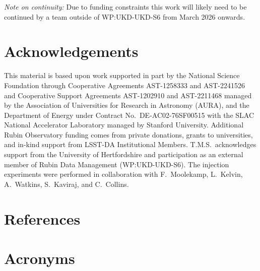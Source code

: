 \documentclass[DM,lsstdraft,authoryear,toc]{lsstdoc}
\begin{document}
\smallskip
\noindent\textit{Note on continuity:} Due to funding constraints this work
will likely need to be continued by a team outside of WP:UKD-UKD-S6 from
March 2026 onwards.


\appendix

\section{Acknowledgements}

This material is based upon work supported in part by the National Science
Foundation through Cooperative Agreements AST-1258333 and AST-2241526 and
Cooperative Support Agreements AST-1202910 and AST-2211468 managed by the
Association of Universities for Research in Astronomy (AURA), and the
Department of Energy under Contract No.\ DE-AC02-76SF00515 with the SLAC
National Accelerator Laboratory managed by Stanford University.
Additional Rubin Observatory funding comes from private donations, grants to
universities, and in-kind support from LSST-DA Institutional Members.
T.M.S.\ acknowledges support from the University of Hertfordshire and
participation as an external member of Rubin Data Management
(WP:UKD-UKD-S6).
The injection experiments were performed in collaboration with F.\ Moolekamp,
L.\ Kelvin, A.\ Watkins, S.\ Kaviraj, and C.\ Collins.

\section{References} \label{sec:bib}
\renewcommand{\refname}{} %


\section{Acronyms} \label{sec:acronyms}

\end{document}
